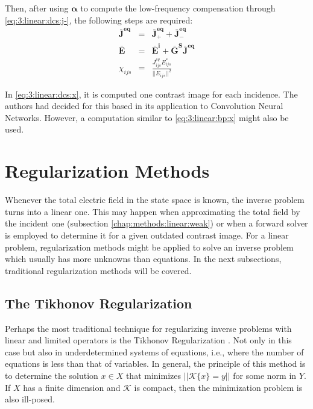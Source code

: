 			Then, after using $\boldsymbol{\alpha}$ to compute the low-frequency compensation through \eqref{eq:3:linear:dcs:j-}, the following steps are required:
			\begin{eqnarray}
				\mathbf{\bar{J}^{eq}} &=& \mathbf{\bar{J}^{eq}_+} + \mathbf{\bar{J}^{eq}_-} \\
				\mathbf{\bar{E}} &=& \mathbf{\bar{E}^i} + \mathbf{\bar{G}^S}\mathbf{\bar{J}^{eq}} \\
				\chi_{ijs} &=& \frac{J^{eq}_{ijs}E_{ijs}^*}{||E_{ijs}||^2} \label{eq:3:linear:dcs:x}
			\end{eqnarray}
		
			In \eqref{eq:3:linear:dcs:x}, it is computed one contrast image for each incidence. The authors had decided for this based in its application to Convolution Neural Networks. However, a computation similar to \eqref{eq:3:linear:bp:x} might also be used.

	\section{Regularization Methods}\label{chap:methods:regularization}
	
		Whenever the total electric field in the state space is known, the inverse problem turns into a linear one. This may happen when approximating the total field by the incident one (subsection \ref{chap:methods:linear:weak}) or when a forward solver is employed to determine it for a given outdated contrast image. For a linear problem, regularization methods might be applied to solve an inverse problem which usually has more unknowns than equations. In the next subsections, traditional regularization methods will be covered.

		\subsection{The Tikhonov Regularization}\label{chap:methods:linear:tikhonov}
			
			Perhaps the most traditional technique for regularizing inverse problems with linear and limited operators is the Tikhonov Regularization \citep{tikhonov1963regularization,kirsch2011introduction}. Not only in this case but also in underdetermined systems of equations, i.e., where the number of equations is less than that of variables. In general, the principle of this method is to determine the solution $x\in X$ that minimizes $||\mathcal{K}\{x\} = y||$ for some norm in $Y$. If $X$ has a finite dimension and $\mathcal{K}$ is compact, then the minimization problem is also ill-posed.
			
